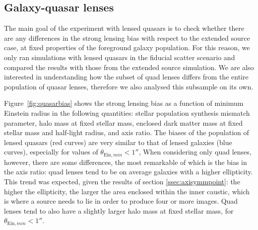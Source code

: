\documentclass{aa}
\def\Sref#1{Section~\ref{#1}\xspace}
\def\Fref#1{Figure~\ref{#1}\xspace}
\begin{document}
\subsection{Galaxy-quasar lenses}\label{ssec:quasarbias}

The main goal of the experiment with lensed quasars is to check whether there are any differences in the strong lensing bias with respect to the extended source case, at fixed properties of the foreground galaxy population.
For this reason, we only ran simulations with lensed quasars in the fiducial scatter scenario and compared the results with those from the extended source simulation.
We are also interested in understanding how the subset of quad lenses differs from the entire population of quasar lenses, therefore we also analysed this subsample on its own.

\Fref{fig:quasarbias} shows the strong lensing bias as a function of minimum Einstein radius in the following quantities: stellar population synthesis mismatch parameter, halo mass at fixed stellar mass, enclosed dark matter mass at fixed stellar mass and half-light radius, and axis ratio.
The biases of the population of lensed quasars (red curves) are very similar to that of lensed galaxies (blue curves), especially for values of $\theta_{\mathrm{Ein},min}<1''$, 
When considering only quad lenses, however, there are some differences, the most remarkable of which is the bias in the axis ratio: quad lenses tend to be on average galaxies with a higher ellipticity.
This trend was expected, given the results of section \ref{ssec:axisymmpoint}: the higher the ellipticity, the larger the area enclosed within the inner caustic, which is where a source needs to lie in order to produce four or more images.
Quad lenses tend to also have a slightly larger halo mass at fixed stellar mass, for $\theta_{\mathrm{Ein},min}<1''$.
\end{document}
